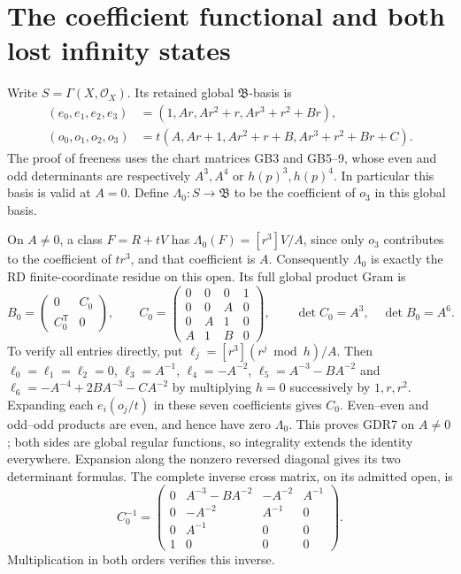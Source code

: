 \documentclass[11pt]{article}
\newcommand{\C}{\mathbb C}
\begin{document}
\section{The coefficient functional and both lost infinity states}
Write $S=\Gamma(X,\mathcal O_X)$. Its retained global
$\mathfrak B$-basis is
\begin{equation}
 \begin{aligned}
 (e_0,e_1,e_2,e_3)&=(1,Ar,Ar^2+r,Ar^3+r^2+Br),\\
 (o_0,o_1,o_2,o_3)&=t(A,Ar+1,Ar^2+r+B,Ar^3+r^2+Br+C).
 \end{aligned}
 \tag{GDR6}
\end{equation}
The proof of freeness uses the chart matrices GB3 and GB5--9,
whose even and odd determinants are respectively $A^3,A^4$
or $h(p)^3,h(p)^4$. In particular this basis is valid at $A=0$.
Define $\Lambda_0:S\to\mathfrak B$ to be the coefficient of
$o_3$ in this global basis.

On $A\ne0$, a class $F=R+tV$ has
$\Lambda_0(F)=[r^3]V/A$, since only $o_3$ contributes to
the coefficient of $tr^3$, and that coefficient is $A$.
Consequently $\Lambda_0$ is exactly the RD finite-coordinate
residue on this open. Its full global product Gram is
\begin{equation}
 B_0=\begin{pmatrix}0&C_0\\C_0^{\mathsf T}&0\end{pmatrix},
 \qquad
 C_0=\begin{pmatrix}
 0&0&0&1\\0&0&A&0\\0&A&1&0\\A&1&B&0
 \end{pmatrix},\qquad
 \det C_0=A^3,\quad\det B_0=A^6.
 \tag{GDR7}
\end{equation}
To verify all entries directly, put
$\ell_j=[r^3](r^j\bmod h)/A$. Then
$\ell_0=\ell_1=\ell_2=0$, $\ell_3=A^{-1}$,
$\ell_4=-A^{-2}$, $\ell_5=A^{-3}-BA^{-2}$ and
$\ell_6=-A^{-4}+2BA^{-3}-CA^{-2}$ by multiplying
$h=0$ successively by $1,r,r^2$. Expanding each
$e_i(o_j/t)$ in these seven coefficients gives $C_0$.
Even--even and odd--odd products are even, and hence have
zero $\Lambda_0$. This proves GDR7 on $A\ne0$; both
sides are global regular functions, so integrality extends
the identity everywhere. Expansion along the nonzero reversed
diagonal gives its two determinant formulas. The complete
inverse cross matrix, on its admitted open, is
\begin{equation}
 C_0^{-1}=
 \begin{pmatrix}
 0&A^{-3}-BA^{-2}&-A^{-2}&A^{-1}\\
 0&-A^{-2}&A^{-1}&0\\0&A^{-1}&0&0\\1&0&0&0
 \end{pmatrix}.
 \tag{GDR8}
\end{equation}
Multiplication in both orders verifies this inverse.
\end{document}
